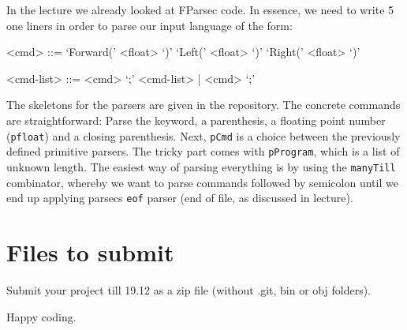 \documentclass[a4paper]{article}
\begin{document}
In the lecture we already looked at FParsec code. In essence, we need to write 5 one liners in order to parse our input language of the form:
\begin{grammar}
<cmd> ::= `Forward(' <float> `)' 
\alt `Left(' <float> `)'
\alt `Right(' <float> `)'

<cmd-list> ::= <cmd> `;' <cmd-list> | <cmd> `;'
\end{grammar}

The skeletons for the parsers are given in the repository. The concrete commands are straightforward: Parse the keyword, a parenthesis, a floating point number (\texttt{pfloat}) and a closing parenthesis.
Next, \texttt{pCmd} is a choice between the previously defined primitive parsers.
The tricky part comes with \texttt{pProgram}, which is a list of unknown length. The easiest way of parsing everything is by using the \texttt{manyTill} combinator, whereby we want
to parse commands followed by semicolon until we end up applying parsecs \texttt{eof} parser (end of file, as discussed in lecture).



\section{Files to submit}

Submit your project till 19.12 as a zip file (without .git, bin or obj folders).

\bigskip

Happy coding.

%


%
\end{document}
